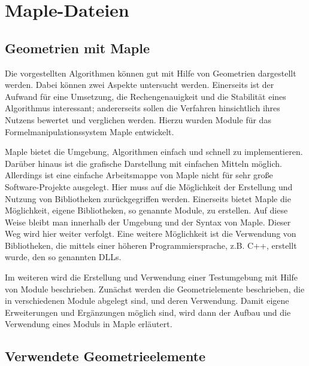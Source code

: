 %
%


\chapter{Maple-Dateien}

\cite{Wat:2017a,Wat:2017b,Wat:2017c,Wat:2017d,Wat:2017e,Wat:2017f}

\section{Geometrien mit Maple}

Die vorgestellten Algorithmen können gut mit Hilfe von Geometrien dargestellt werden. Dabei können zwei Aspekte untersucht werden. Einerseits ist der Aufwand für eine Umsetzung, die Rechengenauigkeit und die Stabilität eines Algorithmus interessant; andererseits sollen die Verfahren hinsichtlich ihres Nutzens bewertet und verglichen werden. Hierzu wurden Module für das Formelmanipulationssystem Maple \cite{Wat:2017a} entwickelt. 

Maple bietet die Umgebung, Algorithmen einfach und schnell zu implementieren. Darüber hinaus ist die grafische Darstellung mit einfachen Mitteln möglich. Allerdings ist eine einfache Arbeitsmappe 
von Maple nicht für sehr große Software-Projekte ausgelegt. Hier muss auf die Möglichkeit der Erstellung und Nutzung von Bibliotheken zurückgegriffen werden. Einerseits bietet Maple die Möglichkeit, eigene Bibliotheken, so genannte Module, zu erstellen. Auf diese Weise bleibt man innerhalb der Umgebung und der Syntax von Maple. Dieser Weg wird hier weiter verfolgt. Eine weitere Möglichkeit ist die Verwendung von Bibliotheken, die mittels einer höheren Programmiersprache, z.B. C++, erstellt wurde, den so genannten DLLs.

Im weiteren wird die Erstellung und Verwendung einer Testumgebung mit Hilfe von Module beschrieben. Zunächst werden die Geometrielemente beschrieben, die in verschiedenen Module abgelegt sind, und deren Verwendung. Damit eigene Erweiterungen und Ergänzungen möglich sind, wird dann der Aufbau und die Verwendung eines Moduls in Maple erläutert.



\section{Verwendete Geometrieelemente}

